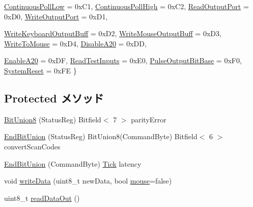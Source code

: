 \begin{DoxyCompactItemize}
\hyperlink{classX86ISA_1_1I8042_a2afce0a47a93eee73a314d53e4890153a051d34b6b649514ad2cd950431393bb1}{ContinuousPollLow} =  0xC1, 
\hyperlink{classX86ISA_1_1I8042_a2afce0a47a93eee73a314d53e4890153a04558413a7a04cf4f5348e31f7e25d41}{ContinuousPollHigh} =  0xC2, 
\hyperlink{classX86ISA_1_1I8042_a2afce0a47a93eee73a314d53e4890153aade35f253085f916a9e93b23f87d7192}{ReadOutputPort} =  0xD0, 
\hyperlink{classX86ISA_1_1I8042_a2afce0a47a93eee73a314d53e4890153a4f2168d3b7108d68797c401ca07dcadd}{WriteOutputPort} =  0xD1, 
\par
\hyperlink{classX86ISA_1_1I8042_a2afce0a47a93eee73a314d53e4890153a3ec3c826304679aa03f277eb6f237b78}{WriteKeyboardOutputBuff} =  0xD2, 
\hyperlink{classX86ISA_1_1I8042_a2afce0a47a93eee73a314d53e4890153a1472aac208d2a3be8de4ea68f2df7582}{WriteMouseOutputBuff} =  0xD3, 
\hyperlink{classX86ISA_1_1I8042_a2afce0a47a93eee73a314d53e4890153aca85cf74a065e596943486095dc366ef}{WriteToMouse} =  0xD4, 
\hyperlink{classX86ISA_1_1I8042_a2afce0a47a93eee73a314d53e4890153a6389bcd602a97980469a0dc45b453b7c}{DisableA20} =  0xDD, 
\par
\hyperlink{classX86ISA_1_1I8042_a2afce0a47a93eee73a314d53e4890153a43a94edb97e3e43d85007fd572854b22}{EnableA20} =  0xDF, 
\hyperlink{classX86ISA_1_1I8042_a2afce0a47a93eee73a314d53e4890153afcf1121396fa916967c3206c5803eb11}{ReadTestInputs} =  0xE0, 
\hyperlink{classX86ISA_1_1I8042_a2afce0a47a93eee73a314d53e4890153a711be2129b337131e878f1dfc6d9a79d}{PulseOutputBitBase} =  0xF0, 
\hyperlink{classX86ISA_1_1I8042_a2afce0a47a93eee73a314d53e4890153a7256ac4658ec7af1eb4705b83266a603}{SystemReset} =  0xFE
 \}
\end{DoxyCompactItemize}
\subsection*{Protected メソッド}
\begin{DoxyCompactItemize}
\item 
\hyperlink{classX86ISA_1_1I8042_ac0c09369d67be3737e41443fac983e6a}{BitUnion8} (StatusReg) Bitfield$<$ 7 $>$ parityError
\item 
\hyperlink{classX86ISA_1_1I8042_a1da145de36668df00f37d59c90f5eae2}{EndBitUnion} (StatusReg) BitUnion8(CommandByte) Bitfield$<$ 6 $>$ convertScanCodes
\item 
\hyperlink{classX86ISA_1_1I8042_ad32329bafc0b040cc55ed2025f6ed478}{EndBitUnion} (CommandByte) \hyperlink{base_2types_8hh_a5c8ed81b7d238c9083e1037ba6d61643}{Tick} latency
\item 
void \hyperlink{classX86ISA_1_1I8042_abc11493a3bf9f79d51f3c434c64483da}{writeData} (uint8\_\-t newData, bool \hyperlink{classX86ISA_1_1I8042_ab174297071ac5e00a17024b3ea4489a8}{mouse}=false)
\item 
uint8\_\-t \hyperlink{classX86ISA_1_1I8042_a1ba9c6a2a23bdea21924e02dc6cf9d22}{readDataOut} ()
\end{DoxyCompactItemize}
